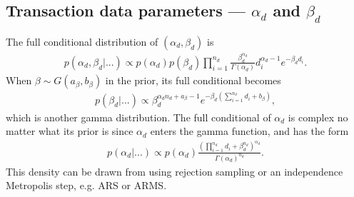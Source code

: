 \documentclass{article}
\begin{document}
\subsection{Transaction data parameters --- $\alpha_d$ and $\beta_d$}
The full conditional distribution of $(\alpha_d,\beta_d)$ is 
\begin{align*}
p(\alpha_d,\beta_d|...) \propto p(\alpha_d)p(\beta_d) \prod_{i=1}^{n_d}\frac{\beta_d^{\alpha_d}}{\Gamma(\alpha_d)}d_i^{\alpha_d - 1}e^{-\beta_dd_i}.
\end{align*}
When $\beta \sim G(a_\beta, b_\beta)$ in the prior, its full conditional becomes
\begin{align*}
p(\beta_d|...) \propto \beta_d^{\alpha_dn_d + a_{\beta} - 1}e^{-\beta_d\left(\sum_{i=1}^{n_d}d_i + b_{\beta}\right)},
\end{align*}
which is another gamma distribution. The full conditional of $\alpha_d$ is complex no matter what its prior is since $\alpha_d$ enters the gamma function, and has the form
\begin{align*}
p(\alpha_d|...) \propto p(\alpha_d)\frac{\left(\prod_{i=1}^{n_d}d_i + \beta_d^{n_d}\right)^{\alpha_d}}{\Gamma(\alpha_d)^{n_d}}.
\end{align*}
This density can be drawn from using rejection sampling or an independence Metropolis step, e.g. ARS or ARMS.
 

\end{document}
